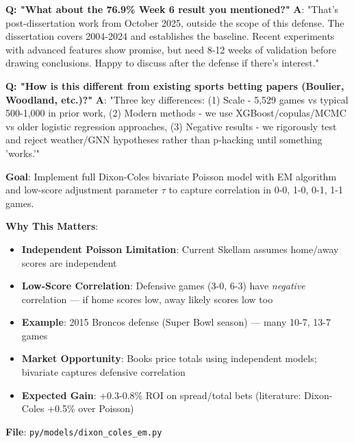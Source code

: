 \textbf{Q: "What about the 76.9\% Week 6 result you mentioned?"}
\textbf{A}: "That's post-dissertation work from October 2025, outside the scope of this defense. The dissertation covers 2004-2024 and establishes the baseline. Recent experiments with advanced features show promise, but need 8-12 weeks of validation before drawing conclusions. Happy to discuss after the defense if there's interest."

\textbf{Q: "How is this different from existing sports betting papers (Boulier, Woodland, etc.)?"}
\textbf{A}: "Three key differences: (1) Scale - 5,529 games vs typical 500-1,000 in prior work, (2) Modern methods - we use XGBoost/copulas/MCMC vs older logistic regression approaches, (3) Negative results - we rigorously test and reject weather/GNN hypotheses rather than p-hacking until something 'works.'"


\textbf{Goal}: Implement full Dixon-Coles bivariate Poisson model with EM algorithm and low-score adjustment parameter $\tau$ to capture correlation in 0-0, 1-0, 0-1, 1-1 games.

\textbf{Why This Matters}:
\begin{itemize}
  \item \textbf{Independent Poisson Limitation}: Current Skellam assumes home/away scores are independent
  \item \textbf{Low-Score Correlation}: Defensive games (3-0, 6-3) have \textit{negative} correlation — if home scores low, away likely scores low too
  \item \textbf{Example}: 2015 Broncos defense (Super Bowl season) — many 10-7, 13-7 games
  \item \textbf{Market Opportunity}: Books price totals using independent models; bivariate captures defensive correlation
  \item \textbf{Expected Gain}: +0.3-0.8\% ROI on spread/total bets (literature: Dixon-Coles +0.5\% over Poisson)
\end{itemize}

\textbf{File}: \texttt{py/models/dixon\_coles\_em.py}

